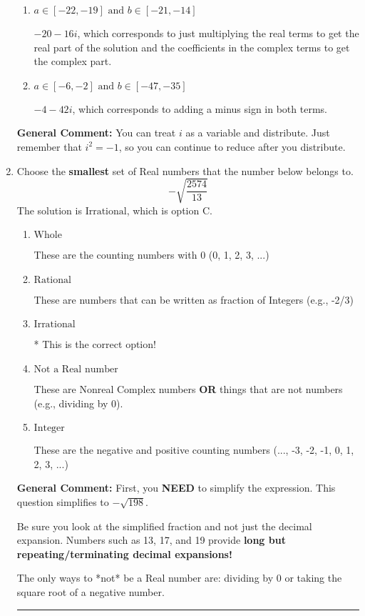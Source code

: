 \documentclass{extbook}[14pt]
\newcommand{\litem}[1]{\item #1

\rule{\textwidth}{0.4pt}}
\begin{document}
\begin{enumerate}
{\begin{enumerate}[label=\Alph*.]
 $-36 + 22 i$, which corresponds to adding a minus sign in the second term.
\item \( a \in [-22, -19] \text{ and } b \in [-21, -14] \)

 $-20 - 16 i$, which corresponds to just multiplying the real terms to get the real part of the solution and the coefficients in the complex terms to get the complex part.
\item \( a \in [-6, -2] \text{ and } b \in [-47, -35] \)

 $-4 - 42 i$, which corresponds to adding a minus sign in both terms.
\end{enumerate}

\textbf{General Comment:} You can treat $i$ as a variable and distribute. Just remember that $i^2=-1$, so you can continue to reduce after you distribute.
}
\litem{
Choose the \textbf{smallest} set of Real numbers that the number below belongs to.
\[ -\sqrt{\frac{2574}{13}} \]The solution is \( \text{Irrational} \), which is option C.\begin{enumerate}[label=\Alph*.]
\item \( \text{Whole} \)

These are the counting numbers with 0 (0, 1, 2, 3, ...)
\item \( \text{Rational} \)

These are numbers that can be written as fraction of Integers (e.g., -2/3)
\item \( \text{Irrational} \)

* This is the correct option!
\item \( \text{Not a Real number} \)

These are Nonreal Complex numbers \textbf{OR} things that are not numbers (e.g., dividing by 0).
\item \( \text{Integer} \)

These are the negative and positive counting numbers (..., -3, -2, -1, 0, 1, 2, 3, ...)
\end{enumerate}

\textbf{General Comment:} First, you \textbf{NEED} to simplify the expression. This question simplifies to $-\sqrt{198}$. 
 
 Be sure you look at the simplified fraction and not just the decimal expansion. Numbers such as 13, 17, and 19 provide \textbf{long but repeating/terminating decimal expansions!} 
 
 The only ways to *not* be a Real number are: dividing by 0 or taking the square root of a negative number. 
 
}
\end{enumerate}
\end{document}
